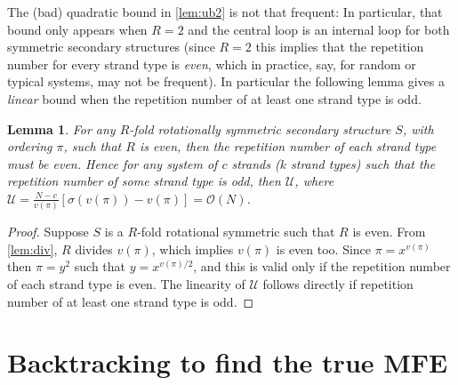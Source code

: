 \documentclass[11pt,letterpaper]{article}  \usepackage[margin=1in]{geometry}
\newtheorem{lemma}[theorem]{Lemma}
\theoremstyle{definition}  \newtheorem{Definition}[theorem]{Definition}
\begin{document}
The (bad) quadratic bound in \cref{lem:ub2} is not that frequent: 
In particular, that bound only appears when $R=2$ and the central loop is an internal loop for both symmetric secondary structures (since $R=2$ this implies that the repetition number for every strand type is {\em even}, which in practice, say, for random or typical systems, may not be frequent).   
In particular the following lemma gives a {\em linear} bound when the repetition number of at least one strand type is odd. 


\begin{lemma} \label{lem:even}
	For any $R$-fold rotationally symmetric  secondary structure $S$, with ordering $\pi$, such that $R$ is even, then the repetition number of each strand type must be even. Hence for any system of $c$ strands ($k$ strand types) such that the repetition number of some strand type is odd, then $\mathcal{U}$, where $\mathcal{U} =  \frac{N-c}{v(\pi)} \left[ \sigma(v(\pi))-v(\pi) \right] = \mathcal{O}(N)$. 
\end{lemma}
\begin{proof}
	Suppose $S$ is a $R$-fold rotational symmetric such that $R$ is even. From \cref{lem:div}, $R$ divides $v(\pi)$, which implies $v(\pi)$ is even too. Since $\pi = x^{v(\pi)}$ then $\pi = y^2$ such that $y= x^{v(\pi)/2}$, and this is valid only if the repetition number of each strand type is even. The linearity of $\mathcal{U}$ follows directly if repetition number of at least one strand type is odd.
\end{proof}




 	

\section{Backtracking to find the true MFE}\label{sec:BT}
\end{document}
